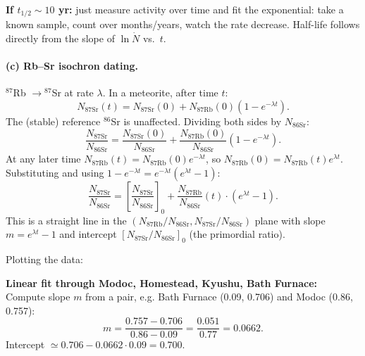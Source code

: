 \documentclass[11pt]{article}
\begin{document}
\textbf{If $t_{1/2}\sim 10$ yr:} just measure activity over time and fit the exponential: take a known sample, count over months/years, watch the rate decrease. Half-life follows directly from the slope of $\ln\dot N$ vs.\ $t$.

\paragraph{(c) Rb--Sr isochron dating.} $^{87}$Rb $\to{}^{87}$Sr at rate $\lambda$. In a meteorite, after time $t$:
\[
N_{87\mathrm{Sr}}(t)=N_{87\mathrm{Sr}}(0)+N_{87\mathrm{Rb}}(0)(1-e^{-\lambda t}).
\]
The (stable) reference $^{86}$Sr is unaffected. Dividing both sides by $N_{86\mathrm{Sr}}$:
\[
\!\!\frac{N_{87\mathrm{Sr}}}{N_{86\mathrm{Sr}}}\!=\!\frac{N_{87\mathrm{Sr}}(0)}{N_{86\mathrm{Sr}}}\!+\!\frac{N_{87\mathrm{Rb}}(0)}{N_{86\mathrm{Sr}}}(1-e^{-\lambda t}).
\]
At any later time $N_{87\mathrm{Rb}}(t)=N_{87\mathrm{Rb}}(0)e^{-\lambda t}$, so $N_{87\mathrm{Rb}}(0)=N_{87\mathrm{Rb}}(t)e^{\lambda t}$. Substituting and using $1-e^{-\lambda t}=e^{-\lambda t}(e^{\lambda t}-1)$:
\[
\boxed{\;\frac{N_{87\mathrm{Sr}}}{N_{86\mathrm{Sr}}}=\!\left[\frac{N_{87\mathrm{Sr}}}{N_{86\mathrm{Sr}}}\right]_0+\frac{N_{87\mathrm{Rb}}}{N_{86\mathrm{Sr}}}(t)\cdot(e^{\lambda t}-1).\;}
\]
This is a straight line in the $(N_{87\mathrm{Rb}}/N_{86\mathrm{Sr}},N_{87\mathrm{Sr}}/N_{86\mathrm{Sr}})$ plane with slope $m=e^{\lambda t}-1$ and intercept $[N_{87\mathrm{Sr}}/N_{86\mathrm{Sr}}]_0$ (the primordial ratio).

Plotting the data:
\begin{center}
\end{center}

\textbf{Linear fit through Modoc, Homestead, Kyushu, Bath Furnace:}\\
Compute slope $m$ from a pair, e.g. Bath Furnace (0.09, 0.706) and Modoc (0.86, 0.757):
\[
m=\frac{0.757-0.706}{0.86-0.09}=\frac{0.051}{0.77}=0.0662.
\]
Intercept $\simeq 0.706-0.0662\cdot 0.09=0.700$.
\end{document}
